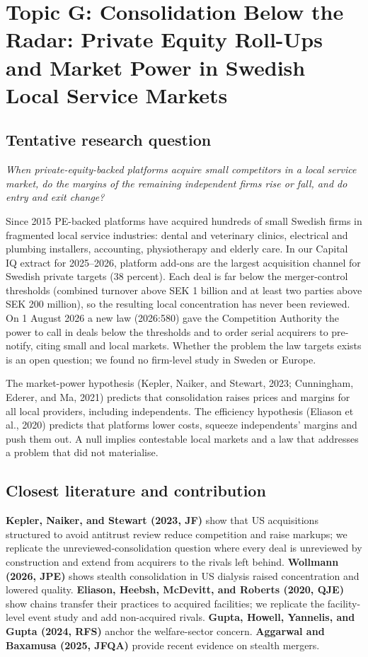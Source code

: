 \documentclass[12pt,a4paper]{article}
\begin{document}
\newpage

\section{Topic G: Consolidation Below the Radar: Private Equity Roll-Ups and Market Power in Swedish Local Service Markets}

\subsection{Tentative research question}

\emph{When private-equity-backed platforms acquire small competitors in a local service market, do the margins of the remaining independent firms rise or fall, and do entry and exit change?}

Since 2015 PE-backed platforms have acquired hundreds of small Swedish firms in fragmented local service industries: dental and veterinary clinics, electrical and plumbing installers, accounting, physiotherapy and elderly care. In our Capital IQ extract for 2025--2026, platform add-ons are the largest acquisition channel for Swedish private targets (38 percent). Each deal is far below the merger-control thresholds (combined turnover above SEK 1 billion and at least two parties above SEK 200 million), so the resulting local concentration has never been reviewed. On 1 August 2026 a new law (2026:580) gave the Competition Authority the power to call in deals below the thresholds and to order serial acquirers to pre-notify, citing small and local markets. Whether the problem the law targets exists is an open question; we found no firm-level study in Sweden or Europe.

The market-power hypothesis (Kepler, Naiker, and Stewart, 2023; Cunningham, Ederer, and Ma, 2021) predicts that consolidation raises prices and margins for all local providers, including independents. The efficiency hypothesis (Eliason et al., 2020) predicts that platforms lower costs, squeeze independents' margins and push them out. A null implies contestable local markets and a law that addresses a problem that did not materialise.

\subsection{Closest literature and contribution}

\textbf{Kepler, Naiker, and Stewart (2023, JF)} show that US acquisitions structured to avoid antitrust review reduce competition and raise markups; we replicate the unreviewed-consolidation question where every deal is unreviewed by construction and extend from acquirers to the rivals left behind. \textbf{Wollmann (2026, JPE)} shows stealth consolidation in US dialysis raised concentration and lowered quality. \textbf{Eliason, Heebsh, McDevitt, and Roberts (2020, QJE)} show chains transfer their practices to acquired facilities; we replicate the facility-level event study and add non-acquired rivals. \textbf{Gupta, Howell, Yannelis, and Gupta (2024, RFS)} anchor the welfare-sector concern. \textbf{Aggarwal and Baxamusa (2025, JFQA)} provide recent evidence on stealth mergers.
\end{document}
